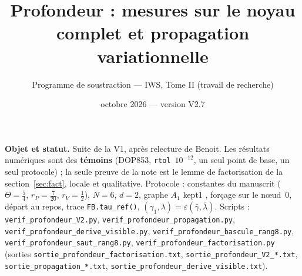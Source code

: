 \documentclass[11pt,a4paper]{article}
\title{Profondeur : mesures sur le noyau complet et propagation variationnelle}
\author{Programme de soustraction --- IWS, Tome II (travail de recherche)}
\date{octobre 2026 --- version V2.7}
\theoremstyle{remark}
\begin{document}
\maketitle

\noindent\textbf{Objet et statut.} Suite de la V1, apr\`es relecture de Benoit. Les r\'esultats num\'eriques sont des \textbf{t\'emoins} (DOP853, \texttt{rtol}~$10^{-12}$, un seul point de base, un seul protocole) ; la seule preuve de la note est le lemme de factorisation de la section~\ref{sec:fact}, locale et qualitative. Protocole : constantes du manuscrit ($\Theta=\frac54$, $r_P=\frac7{20}$, $r_V=\frac12$), $N=6$, $d=2$, graphe $A_1$ \og kept1 \fg, for\c{c}age sur le n\oe ud~0, d\'epart au repos, trace \texttt{FB.tau\_ref()}, $(\gamma_1,\lambda)=\varepsilon(\bar\gamma,\bar\lambda)$. Scripts : \texttt{verif\_profondeur\_V2.py}, \texttt{verif\_profondeur\_propagation.py}, \texttt{verif\_profondeur\_derive\_visible.py}, \texttt{verif\_profondeur\_bascule\_rang8.py}, \texttt{verif\_profondeur\_saut\_rang8.py}, \texttt{verif\_profondeur\_factorisation.py} (sorties \texttt{sortie\_profondeur\_factorisation.txt},  \texttt{sortie\_profondeur\_V2\_*.txt}, \texttt{sortie\_propagation\_*.txt}, \texttt{sortie\_profondeur\_derive\_visible.txt}).
\end{document}
